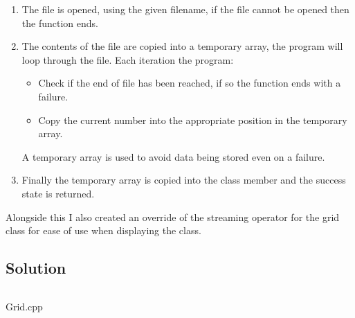         \begin{enumerate}
            \item The file is opened, using the given filename, 
                if the file cannot be opened then the function ends.

            \item The contents of the file are copied into a temporary array, 
                the program will loop through the file. Each iteration the program:
                \begin{itemize}
                    \item Check if the end of file has been reached, 
                        if so the function ends with a failure.

                    \item Copy the current number into the appropriate position in the temporary array.
                \end{itemize}
                A temporary array is used to avoid data being stored even on a failure.
                
            \item Finally the temporary array is copied into the class member and the success state is returned.
        \end{enumerate}

        Alongside this I also created an override of the streaming operator for the grid
        class for ease of use when displaying the class.

    \subsection*{Solution}

        \begin{listing}[H]
            \inputminted[firstline=14]{cpp}{../Tasks/02-Reading/Grid.cpp}
            \caption{Grid.cpp}
        \end{listing}